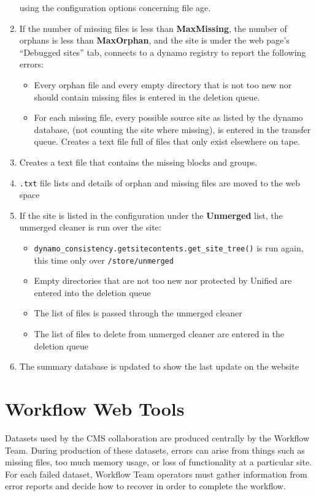 \begin{enumerate}
  using the configuration options concerning file age.
\item If the number of missing files is less than {\bf MaxMissing},
  the number of orphans is less than {\bf MaxOrphan},
  and the site is under the web page's “Debugged sites” tab,
  connects to a dynamo registry to report the following errors:
  \begin{itemize}
  \item Every orphan file and every empty directory that is not too new
    nor should contain missing files is entered in the deletion queue.
  \item For each missing file, every possible source site as listed by the dynamo database,
    (not counting the site where missing), is entered in the transfer queue.
    Creates a text file full of files that only exist elsewhere on tape.
  \end{itemize}
\item Creates a text file that contains the missing blocks and groups.
\item \texttt{.txt} file lists and details of orphan and missing files are moved
  to the web space
\item If the site is listed in the configuration under the {\bf Unmerged} list,
  the unmerged cleaner is run over the site:
  \begin{itemize}
  \item \texttt{dynamo\_consistency.getsitecontents.get\_site\_tree()} is run again,
    this time only over \texttt{/store/unmerged}
  \item Empty directories that are not too new nor protected by Unified
    are entered into the deletion queue
  \item The list of files is passed through the unmerged cleaner
  \item The list of files to delete from unmerged cleaner
    are entered in the deletion queue
  \end{itemize}
\item The summary database is updated to show the last update on the website
\end{enumerate}

\section{Workflow Web Tools}

Datasets used by the CMS collaboration are produced centrally by the Workflow Team.
During production of these datasets, errors can arise from things such as missing files,
too much memory usage, or loss of functionality at a particular site.
For each failed dataset, Workflow Team operators must gather information from error reports
and decide how to recover in order to complete the workflow.

